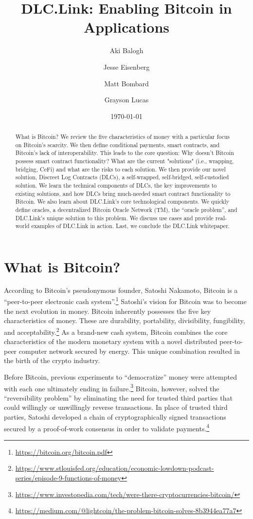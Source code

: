 \documentclass[twoside, a4paper, 11pt]{article}
\title{DLC.Link: Enabling Bitcoin in Applications}
\author{Aki Balogh \and Jesse Eisenberg \and Matt Bombard \and Grayson Lucas}
\date{\today}
\begin{document}
\maketitle
  \begin{abstract}
    What is Bitcoin? We review the five characteristics of money with a particular focus on Bitcoin’s scarcity. We then define conditional payments, smart contracts, and Bitcoin's lack of interoperability.
    This leads to the core question: Why doesn’t Bitcoin possess smart contract functionality? What are the current "solutions" (i.e., wrapping, bridging, CeFi) and what are the risks to each solution.
    We then provide our novel solution, Discreet Log Contracts (DLCs), a self-wrapped, self-bridged, self-custodied solution. We learn the technical components of DLCs, the key improvements to existing solutions, and how DLCs bring much-needed smart contract functionality to Bitcoin. We also learn about DLC.Link’s core technological components.
    We quickly define oracles, a decentralized Bitcoin Oracle Network (TM), the “oracle problem”, and DLC.Link’s unique solution to this problem.
    We discuss use cases and provide real-world examples of DLC.Link in action.
    Last, we conclude the DLC.Link whitepaper.
  \end{abstract}

  \section{What is Bitcoin?}
  According to Bitcoin’s pseudonymous founder, Satoshi Nakamoto, Bitcoin is a “peer-to-peer electronic cash system”.\footnote{\url{https://bitcoin.org/bitcoin.pdf}} Satoshi’s vision for Bitcoin was to become the next evolution in money. Bitcoin inherently possesses the five key characteristics of money. These are durability, portability, divisibility, fungibility, and acceptability.\footnote{\url{https://www.stlouisfed.org/education/economic-lowdown-podcast-series/episode-9-functions-of-money}} As a brand-new cash system, Bitcoin combines the core characteristics of the modern monetary system with a novel distributed peer-to-peer computer network secured by energy. This unique combination resulted in the birth of the crypto industry.

  Before Bitcoin, previous experiments to “democratize” money were attempted with each one ultimately ending in failure.\footnote{\url{https://www.investopedia.com/tech/were-there-cryptocurrencies-bitcoin/}} Bitcoin, however, solved the “reversibility problem” by eliminating the need for trusted third parties that could willingly or unwillingly reverse transactions. In place of trusted third parties, Satoshi developed a chain of cryptographically signed transactions secured by a proof-of-work consensus in order to validate payments.\footnote{\url{https://medium.com/@lightcoin/the-problem-bitcoin-solves-8b3944ea77a7}}
\end{document}
